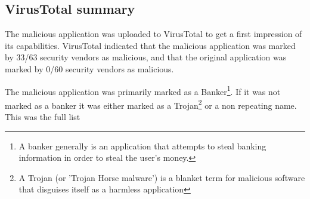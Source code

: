 \subsection{VirusTotal summary}

The malicious application was uploaded to VirusTotal to get a first impression of its capabilities.
VirusTotal indicated that the malicious application was marked by 33/63 security vendors as malicious, 
and that the original application was marked by 0/60 security vendors as malicious.

The malicious application was primarily marked as a Banker\footnote{A banker generally is an application that attempts to steal banking information in order to steal the user's money.}. 
If it was not marked as a banker it was either marked as a Trojan\footnote{A Trojan (or 'Trojan Horse malware') is a blanket term for malicious software that disguises itself as a harmless application} or a non repeating name.
This was the full list


